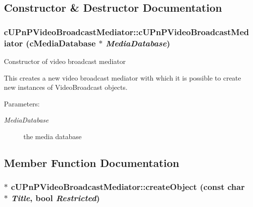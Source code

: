 \subsection{Constructor \& Destructor Documentation}
\hypertarget{classcUPnPVideoBroadcastMediator_58179b50ee5a5952cff70aa4473845f9}{
\subsubsection[{cUPnPVideoBroadcastMediator}]{\setlength{\rightskip}{0pt plus 5cm}cUPnPVideoBroadcastMediator::cUPnPVideoBroadcastMediator ({\bf cMediaDatabase} $\ast$ {\em MediaDatabase})}}
\label{classcUPnPVideoBroadcastMediator_58179b50ee5a5952cff70aa4473845f9}


Constructor of video broadcast mediator

This creates a new video broadcast mediator with which it is possible to create new instances of VideoBroadcast objects.

\begin{Desc}
\item[Parameters:]
\begin{description}
\item[{\em MediaDatabase}]the media database \end{description}
\end{Desc}


\subsection{Member Function Documentation}
\hypertarget{classcUPnPVideoBroadcastMediator_14fefa90807d40d91a80712729af2beb}{
\subsubsection[{createObject}]{ $\ast$ cUPnPVideoBroadcastMediator::createObject (const char $\ast$ {\em Title}, \/  bool {\em Restricted})}}
\label{classcUPnPVideoBroadcastMediator_14fefa90807d40d91a80712729af2beb}


